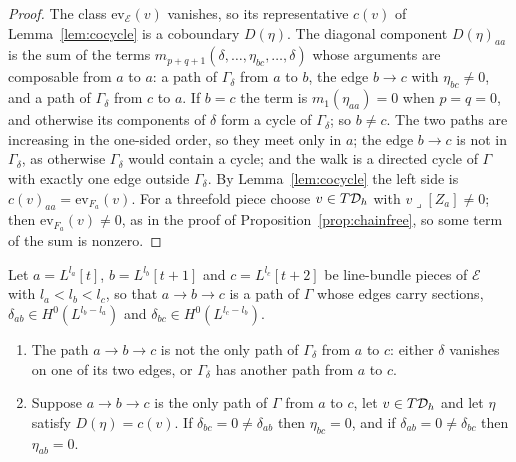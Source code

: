 \begin{proof}
The class $\mathrm{ev}_{\mathcal{E}}(v)$ vanishes, so its representative $c(v)$ of Lemma~\ref{lem:cocycle} is a coboundary $D(\eta)$. The diagonal component $D(\eta)_{aa}$ is the sum of the terms $m_{p+q+1}(\delta,\dots,\eta_{bc},\dots,\delta)$ whose arguments are composable from $a$ to $a$: a path of $\Gamma_{\delta}$ from $a$ to $b$, the edge $b\to c$ with $\eta_{bc}\ne0$, and a path of $\Gamma_{\delta}$ from $c$ to $a$. If $b=c$ the term is $m_{1}(\eta_{aa})=0$ when $p=q=0$, and otherwise its components of $\delta$ form a cycle of $\Gamma_{\delta}$; so $b\ne c$. The two paths are increasing in the one-sided order, so they meet only in $a$; the edge $b\to c$ is not in $\Gamma_{\delta}$, as otherwise $\Gamma_{\delta}$ would contain a cycle; and the walk is a directed cycle of $\Gamma$ with exactly one edge outside $\Gamma_{\delta}$. By Lemma~\ref{lem:cocycle} the left side is $c(v)_{aa}=\mathrm{ev}_{F_{a}}(v)$. For a threefold piece choose $v\in T\mathcal{D}_{h}$ with $v\lrcorner[Z_{a}]\ne0$; then $\mathrm{ev}_{F_{a}}(v)\ne0$, as in the proof of Proposition~\ref{prop:chainfree}, so some term of the sum is nonzero.
\end{proof}

\begin{lemma}\label{lem:mcrules}
Let $a=L^{l_{a}}[t]$, $b=L^{l_{b}}[t+1]$ and $c=L^{l_{c}}[t+2]$ be line-bundle pieces of $\mathcal{E}$ with $l_{a}<l_{b}<l_{c}$, so that $a\to b\to c$ is a path of $\Gamma$ whose edges carry sections, $\delta_{ab}\in H^{0}(L^{l_{b}-l_{a}})$ and $\delta_{bc}\in H^{0}(L^{l_{c}-l_{b}})$.
\begin{enumerate}[label=\textup{(\roman*)},leftmargin=2.4em,itemsep=2pt]
\item The path $a\to b\to c$ is not the only path of $\Gamma_{\delta}$ from $a$ to $c$: either $\delta$ vanishes on one of its two edges, or $\Gamma_{\delta}$ has another path from $a$ to $c$.
\item Suppose $a\to b\to c$ is the only path of $\Gamma$ from $a$ to $c$, let $v\in T\mathcal{D}_{h}$ and let $\eta$ satisfy $D(\eta)=c(v)$. If $\delta_{bc}=0\ne\delta_{ab}$ then $\eta_{bc}=0$, and if $\delta_{ab}=0\ne\delta_{bc}$ then $\eta_{ab}=0$.
\end{enumerate}
\end{lemma}

